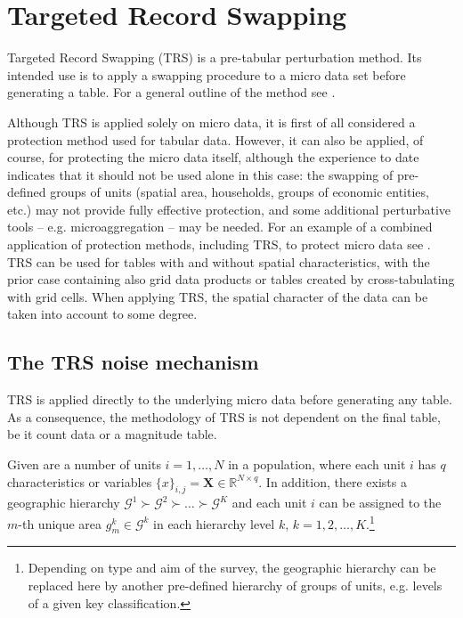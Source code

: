 \section{Targeted Record Swapping} \label{sec:trs}

Targeted Record Swapping (TRS) is a pre-tabular perturbation method. Its intended use is to apply a swapping procedure to a micro data set before generating a table.
For a general outline of the method see \citet[5.6]{HundepoolEtAl2024}.

Although TRS is applied solely on micro data, it is first of all considered a protection method used for tabular data. However, it can also be applied, of course, for protecting the micro data itself, although the experience to date indicates that it should not be used alone in this case: the swapping of pre-defined groups of units (spatial area, households, groups of economic entities, etc.) may not provide fully effective protection, and some additional perturbative tools -- e.g. microaggregation \citep[3.4.5]{HundepoolEtAl2024} -- may be needed. For an example of a combined application of protection methods, including TRS, to protect micro data see \citep{Mlodak2022}.
TRS can be used for tables with and without spatial characteristics, with the prior case containing also grid data products or tables created by cross-tabulating with grid cells.   
When applying TRS, the spatial character of the data can be taken into account to some degree. 


\subsection{The TRS noise mechanism}

TRS is applied directly to the underlying micro data before generating any table. As a consequence, the methodology of TRS is not dependent on the final table, be it count data or a magnitude table.

Given are a number of units $i = 1, \ldots, N$ in a population, where each unit $i$ has $q$ characteristics or variables $\{x\}_{i,j} = \mathbf{X} \in \mathbb{R}^{N\times q}$.
In addition, there exists a geographic hierarchy $\mathcal{G}^{1} \succ \mathcal{G}^{2} \succ \ldots \succ \mathcal{G}^{K}$ and each unit $i$ can be assigned to the $m$-th unique area $g_m^{k} \in \mathcal{G}^{k}$ in each hierarchy level $k$, $k=1,2,\ldots,K$.\footnote{
    Depending on type and aim of the survey, the geographic hierarchy can be replaced here by another pre-defined hierarchy of groups of units, e.g. levels of a given key classification.}

